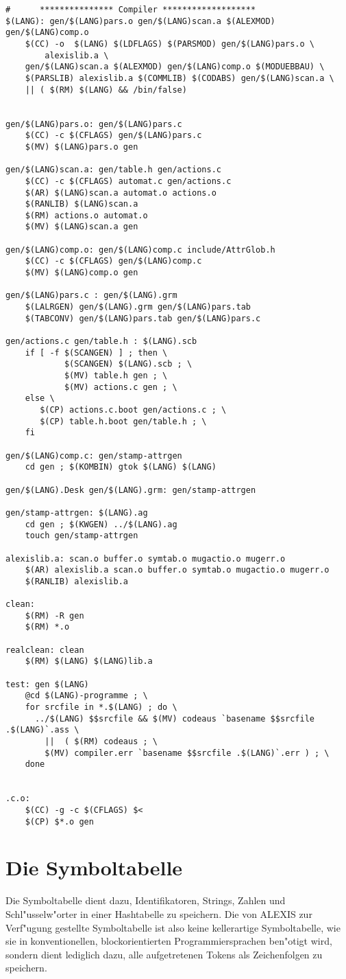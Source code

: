 \begin{verbatim}
#      *************** Compiler *******************
$(LANG): gen/$(LANG)pars.o gen/$(LANG)scan.a $(ALEXMOD) gen/$(LANG)comp.o
	$(CC) -o  $(LANG) $(LDFLAGS) $(PARSMOD) gen/$(LANG)pars.o \
        alexislib.a \
	gen/$(LANG)scan.a $(ALEXMOD) gen/$(LANG)comp.o $(MODUEBBAU) \
	$(PARSLIB) alexislib.a $(COMMLIB) $(CODABS) gen/$(LANG)scan.a \
	|| ( $(RM) $(LANG) && /bin/false)


gen/$(LANG)pars.o: gen/$(LANG)pars.c 
	$(CC) -c $(CFLAGS) gen/$(LANG)pars.c
	$(MV) $(LANG)pars.o gen

gen/$(LANG)scan.a: gen/table.h gen/actions.c
	$(CC) -c $(CFLAGS) automat.c gen/actions.c 
	$(AR) $(LANG)scan.a automat.o actions.o 
	$(RANLIB) $(LANG)scan.a
	$(RM) actions.o automat.o 
	$(MV) $(LANG)scan.a gen 

gen/$(LANG)comp.o: gen/$(LANG)comp.c include/AttrGlob.h
	$(CC) -c $(CFLAGS) gen/$(LANG)comp.c
	$(MV) $(LANG)comp.o gen

gen/$(LANG)pars.c : gen/$(LANG).grm
	$(LALRGEN) gen/$(LANG).grm gen/$(LANG)pars.tab
	$(TABCONV) gen/$(LANG)pars.tab gen/$(LANG)pars.c

gen/actions.c gen/table.h : $(LANG).scb
	if [ -f $(SCANGEN) ] ; then \
	        $(SCANGEN) $(LANG).scb ; \
	        $(MV) table.h gen ; \
	        $(MV) actions.c gen ; \
	else \
	   $(CP) actions.c.boot gen/actions.c ; \
	   $(CP) table.h.boot gen/table.h ; \
	fi

gen/$(LANG)comp.c: gen/stamp-attrgen
	cd gen ; $(KOMBIN) gtok $(LANG) $(LANG)

gen/$(LANG).Desk gen/$(LANG).grm: gen/stamp-attrgen

gen/stamp-attrgen: $(LANG).ag
	cd gen ; $(KWGEN) ../$(LANG).ag
	touch gen/stamp-attrgen

alexislib.a: scan.o buffer.o symtab.o mugactio.o mugerr.o 
	$(AR) alexislib.a scan.o buffer.o symtab.o mugactio.o mugerr.o 
	$(RANLIB) alexislib.a

clean:
	$(RM) -R gen
	$(RM) *.o 

realclean: clean
	$(RM) $(LANG) $(LANG)lib.a

test: gen $(LANG)
	@cd $(LANG)-programme ; \
	for srcfile in *.$(LANG) ; do \
	  ../$(LANG) $$srcfile && $(MV) codeaus `basename $$srcfile .$(LANG)`.ass \
	    ||  ( $(RM) codeaus ; \
	    $(MV) compiler.err `basename $$srcfile .$(LANG)`.err ) ; \
	done


.c.o:
	$(CC) -g -c $(CFLAGS) $<
	$(CP) $*.o gen
\end{verbatim}
\vfill \eject
\chapter{Die Symboltabelle}
Die Symboltabelle dient dazu, Identifikatoren, Strings, Zahlen und
Schl"usselw"orter in einer Hashtabelle zu speichern. Die von ALEXIS zur
Verf"ugung gestellte Symboltabelle ist also keine kellerartige Symboltabelle, wie
sie in konventionellen, blockorientierten Programmiersprachen ben"otigt wird,
sondern dient lediglich dazu, alle aufgetretenen Tokens als Zeichenfolgen zu
speichern.

